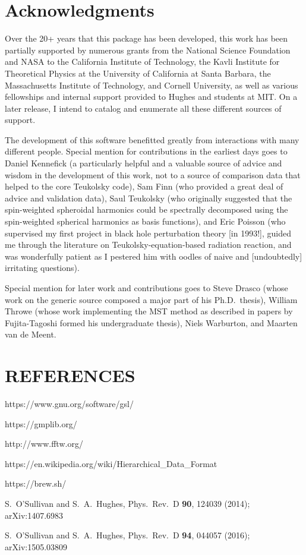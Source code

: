 \documentclass[11pt]{article}
\begin{document}
\section*{Acknowledgments}

Over the 20+ years that this package has been developed, this work has been partially supported by numerous grants from the National Science Foundation and NASA to the California Institute of Technology, the Kavli Institute for Theoretical Physics at the University of California at Santa Barbara, the Massachusetts Institute of Technology, and Cornell University, as well as various fellowships and internal support provided to Hughes and students at MIT.  On a later release, I intend to catalog and enumerate all these different sources of support.

The development of this software benefitted greatly from interactions with many different people.  Special mention for contributions in the earliest days goes to Daniel Kennefick (a particularly helpful and a valuable source of advice and wisdom in the development of this work, not to a source of comparison data that helped to the core Teukolsky code), Sam Finn (who provided a great deal of advice and validation data), Saul Teukolsky (who originally suggested that the spin-weighted spheroidal harmonics could be spectrally decomposed using the spin-weighted spherical harmonics as basis functions), and Eric Poisson (who supervised my first project in black hole perturbation theory [in 1993!], guided me through the literature on Teukolsky-equation-based radiation reaction, and was wonderfully patient as I pestered him with oodles of naive and [undoubtedly] irritating questions).

Special mention for later work and contributions goes to Steve Drasco (whose work on the generic source composed a major part of his Ph.D.\ thesis), William Throwe (whose work implementing the MST method as described in papers by Fujita-Tagoshi formed his undergraduate thesis), Niels Warburton, and Maarten van de Meent.

\clearpage

\section{REFERENCES}
\begin{thebibliography}{99}

 https://www.gnu.org/software/gsl/

 https://gmplib.org/

 http://www.fftw.org/

 https://en.wikipedia.org/wiki/Hierarchical\_Data\_Format

 https://brew.sh/

 S.\ O'Sullivan and S.\ A.\ Hughes, Phys.\ Rev.\ D {\bf 90}, 124039 (2014); arXiv:1407.6983

 S.\ O'Sullivan and S.\ A.\ Hughes, Phys.\ Rev.\ D {\bf 94}, 044057 (2016); arXiv:1505.03809

\end{thebibliography}
\end{document}
